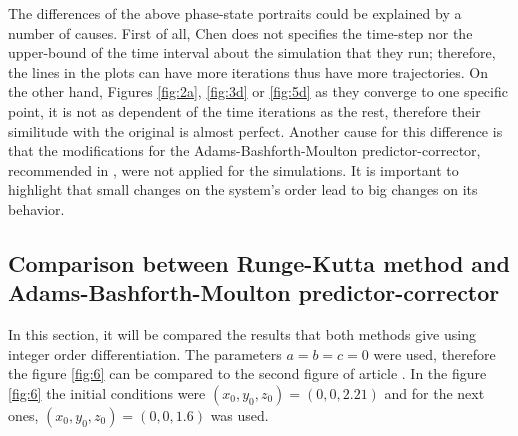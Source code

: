     The differences of the above phase-state portraits could be explained by a number of causes. First of all, Chen does not specifies the time-step nor the upper-bound of the time interval about the simulation that they run; therefore, the lines in the plots can have more iterations thus have more trajectories. On the other hand, Figures \ref{fig:2a}, \ref{fig:3d} or \ref{fig:5d} as they converge to one specific point, it is not as dependent of the time iterations as the rest, therefore their similitude with the original is almost perfect. Another cause for this difference is that the modifications for the Adams-Bashforth-Moulton predictor-corrector, recommended in \cite{diethelm2002predictor}, were not applied for the simulations. It is important to highlight that small changes on the system's order lead to big changes on its behavior.

\subsection{Comparison between Runge-Kutta method and Adams-Bashforth-Moulton predictor-corrector}

In this section, it will be compared the results that both methods give using integer order differentiation. The parameters $a=b=c=0$ were used, therefore the figure \ref{fig:6} can be compared to the second figure of article \cite{integrability}. In the figure \ref{fig:6} the initial conditions were $(x_0,y_0,z_0)=(0,0,2.21)$ and for the next ones, $(x_0,y_0,z_0)=(0,0,1.6)$ was used.

